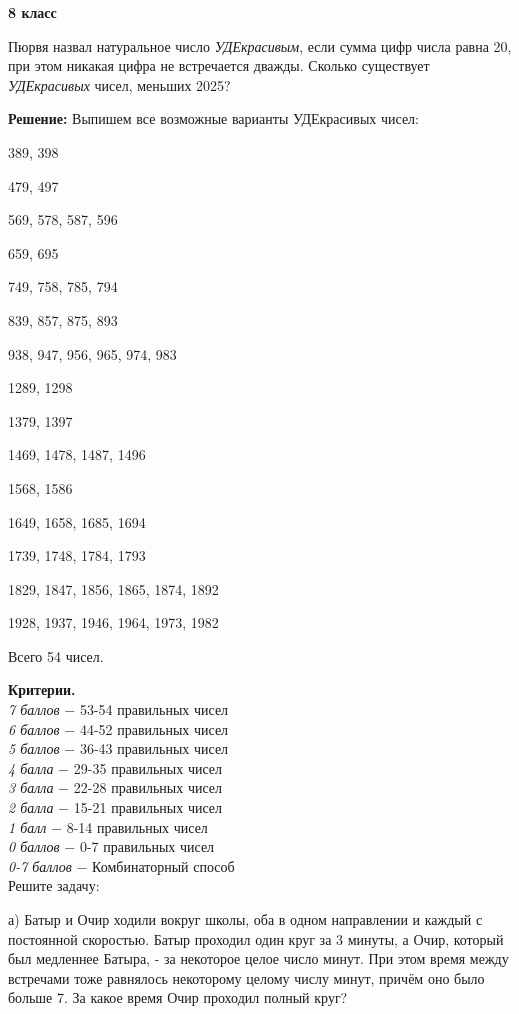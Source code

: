 \centerline{\bf \Large  8 класс}

 Пюрвя назвал натуральное число \textit{УДЕкрасивым}, если сумма цифр числа равна 20, при этом никакая цифра не встречается дважды. Сколько существует \textit{УДЕкрасивых} чисел, меньших 2025?

\textbf{Решение:} Выпишем все возможные варианты УДЕкрасивых чисел:

389, 398

479, 497

569, 578, 587, 596

659, 695

749, 758, 785, 794

839, 857, 875, 893

938, 947, 956, 965, 974, 983

1289, 1298

1379, 1397

1469, 1478, 1487, 1496

1568, 1586

1649, 1658, 1685, 1694

1739, 1748, 1784, 1793

1829, 1847, 1856, 1865, 1874, 1892

1928, 1937, 1946, 1964, 1973, 1982

Всего 54 чисел.

\textbf{Критерии.} \\
\textit{7 баллов} $-$ 53-54 правильных чисел\\
\textit{6 баллов} $-$ 44-52 правильных чисел\\
\textit{5 баллов} $-$ 36-43 правильных чисел\\
\textit{4 балла} $-$ 29-35 правильных чисел\\
\textit{3 балла} $-$ 22-28 правильных чисел\\
\textit{2 балла} $-$ 15-21 правильных чисел\\
\textit{1 балл} $-$ 8-14 правильных чисел\\
\textit{0 баллов} $-$ 0-7 правильных чисел\\
\textit{0-7 баллов} $-$ Комбинаторный способ\\

 Решите задачу:

а) Батыр и Очир ходили вокруг школы, оба в одном направлении и каждый с постоянной скоростью. Батыр проходил один круг за 3 минуты, а Очир, который был медленнее Батыра, - за некоторое целое число минут. При этом время между встречами тоже равнялось некоторому целому числу минут, причём оно было больше 7. За какое время Очир проходил полный круг?


